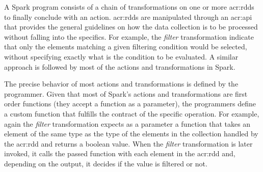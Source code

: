\label{sec:logic}






A Spark program consists of a chain of transformations on one or more \acrshort{acr:rdd}s to finally conclude with an action. \acrshort{acr:rdd}s are manipulated through an \acrshort{acr:api} that provides the general guidelines on how the data collection is to be processed without falling into the specifics. For example, the \textit{filter} transformation indicate that only the elements matching a given filtering condition would be selected, without specifying exactly what is the condition to be evaluated. A similar approach is followed by most of the actions and transformations in Spark.

The precise behavior of most actions and transformations is defined by the programmer. Given that most of Spark's actions and transformations are first order functions (they accept a function as a parameter), the programmers define a custom function that fulfills the contract of the specific operation. For example, again the \textit{filter} transformation expects as a parameter a function that takes an element of the same type as the type of the elements in the collection handled by the \acrshort{acr:rdd} and returns a boolean value. When the \textit{filter} transformation is later invoked, it calls the passed function with each element in the \acrshort{acr:rdd} and, depending on the output, it decides if the value is filtered or not.


